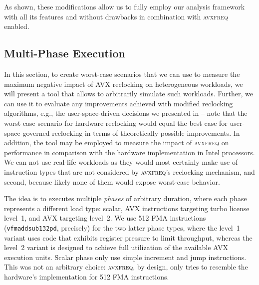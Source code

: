 As shown, these modifications allow us to fully employ our analysis framework with all its features and without drawbacks in combination with \textsc{avxfreq} enabled.

\subsection{Multi-Phase Execution}
\label{sec:evaluation:design:stagedexecution}

In this section, to create worst-case scenarios that we can use to measure the maximum negative impact of \textsc{AVX} reclocking on heterogeneous workloads, we will present a tool that allows to arbitrarily simulate such workloads. Further, we can use it to evaluate any improvements achieved with modified reclocking algorithms, e.g., the user-space-driven decisions we presented in  -- note that the worst case scenario for hardware reclocking would equal the best case for user-space-governed reclocking in terms of theoretically possible improvements. In addition, the tool may be employed to measure the impact of \textsc{avxfreq} on performance in comparison with the hardware implementation in Intel processors. We can not use real-life workloads as they would most certainly make use of instruction types that are not considered by \textsc{avxfreq}'s reclocking mechanism, and second, because likely none of them would expose worst-case behavior.

The idea is to executes multiple \emph{phases} of arbitrary duration, where each phase represents a different load type: scalar, \gls{AVX} instructions targeting turbo license level~1, and \gls{AVX} targeting level~2. We use \SI[number-unit-product=-]{512}{\bit} \gls{FMA} instructions (\texttt{vfmaddsub132pd}, precisely) for the two latter phase types, where the level~1 variant uses code that exhibits register pressure to limit throughput, whereas the level~2 variant is designed to achieve full utilization of the available \gls{AVX} execution units. Scalar phase only use simple increment and jump instructions. This was not an arbitrary choice: \textsc{avxfreq}, by design, only tries to resemble the hardware's implementation for \SI[number-unit-product=-]{512}{\bit} \gls{FMA} instructions.

